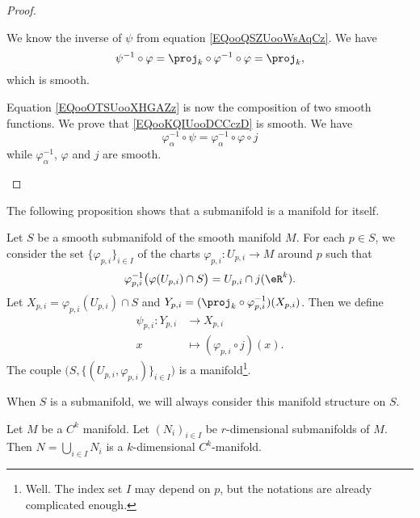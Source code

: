 \begin{proof}
\begin{subproof}
		We know the inverse of \( \psi\) from equation \eqref{EQooQSZUooWsAqCz}. We have
		\begin{equation}
			\psi^{-1}\circ\varphi=\proj_k\circ\varphi^{-1}\circ\varphi=\proj_k,
		\end{equation}
		which is smooth.

		Equation \eqref{EQooOTSUooXHGAZz} is now the composition of two smooth functions.
		We prove that \eqref{EQooKQIUooDCCczD} is smooth. We have
		\begin{equation}
			\varphi_{\alpha}^{-1}\circ\psi=\varphi_{\alpha}^{-1}\circ\varphi\circ j
		\end{equation}
		while \( \varphi_{\alpha}^{-1}\), \( \varphi\) and \( j\) are smooth.
	\end{subproof}
\end{proof}

The following proposition shows that a submanifold is a manifold for itself.
\begin{proposition}      \label{PROPooRZIHooXIhnpq}
	Let \( S\) be a smooth submanifold of the smooth manifold \( M\). For each \( p\in S\), we consider the set \( \{ \varphi_{p,i} \}_{i\in I}\) of the charts \( \varphi_{p,i}\colon U_{p,i}\to M\) around \( p\) such that
	\begin{equation}
		\varphi_{p,i}^{-1}\big( \varphi(U_{p,i})\cap S \big)=U_{p,i}\cap j(\eR^k).
	\end{equation}
	Let \( X_{p,i}=\varphi_{p,i}(U_{p,i})\cap S\) and \( Y_{p,i}=(\proj_k\circ\varphi_{p,i}^{-1})(X_{p,i})\). Then we define
	\begin{equation}
		\begin{aligned}
			\psi_{p,i}\colon Y_{p,i} & \to X_{p,i}                        \\
			x                        & \mapsto (\varphi_{p,i}\circ j)(x).
		\end{aligned}
	\end{equation}
	The couple \( \big( S,\{ (U_{p,i},\varphi_{p,i}) \}_{i\in I} \big)\) is a manifold\footnote{Well. The index set \( I\) may depend on \( p\), but the notations are already complicated enough.}.

	When \( S\) is a submanifold, we will always consider this manifold structure on \( S\).
\end{proposition}

\begin{proposition}	\label{PROPooFFDYooLmwISw}
	Let \( M\) be a \( C^k\) manifold. Let \( (N_i)_{i\in I}\) be \( r\)-dimensional submanifolds of \( M\). Then \( N=\bigcup_{i\in I}N_i\) is a \( k\)-dimensional \( C^k\)-manifold.
\end{proposition}

